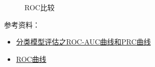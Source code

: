 \begin{figure}[h]
	\centering
	\quad
	\caption{ROC比较}
	\label{fig:roc-cmp}
\end{figure}

参考资料：
\begin{itemize}
	\item \href{https://blog.csdn.net/pipisorry/article/details/51788927}{分类模型评估之ROC-AUC曲线和PRC曲线}
	\item \href{https://zh.wikipedia.org/zh/ROC%E6%9B%B2%E7%BA%BF}{ROC曲线}
\end{itemize}


